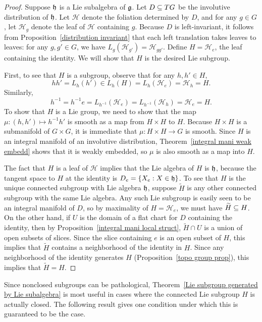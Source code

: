 \begin{proof}
Suppose $\mathfrak{h}$ is a Lie subalgebra of $\mathfrak{g}$. Let $D\subseteq TG$ be the involutive distribution of $\mathfrak{h}$. Let $\mathcal{H}$ denote the foliation determined by $D$, and for any $g\in G$, let $\mathcal{H}_g$ denote the leaf of $\mathcal{H}$ containing $g$. Because $D$ is left-invariant, it follows from Proposition~\ref{distribution invariant} that each left translation takes leaves to leaves: for any $g,g'\in G$, we have $L_g(\mathcal{H}_{g'})=\mathcal{H}_{gg'}$. Define $H=\mathcal{H}_e$, the leaf containing the identity. We will show that $H$ is the desired Lie subgroup.

First, to see that $H$ is a subgroup, observe that for any $h,h'\in H$,
\[hh'=L_h(h')\in L_h(H)=L_h(\mathcal{H}_e)=\mathcal{H}_h=H.\]
Similarly,
\[h^{-1}=h^{-1}e=L_{h^{-1}}(\mathcal{H}_e)=L_{h^{-1}}(\mathcal{H}_h)=\mathcal{H}_e=H.\]
To show that $H$ is a Lie group, we need to show that the map $\mu:(h,h')\mapsto h^{-1}h'$ is smooth as a map from 
$H\times H$ to $H$. Because $H\times H$ is a submanifold of $G\times G$, it is immediate that $\mu:H\times H\to G$ 
is smooth. Since $H$ is an integral manifold of an involutive distribution, Theorem~\ref{integral mani weak embedd} shows that it is weakly embedded, so $\mu$ is
also smooth as a map into $H$.\par
The fact that $H$ is a leaf of $\mathcal{H}$ implies that the Lie algebra of $H$ is $\mathfrak{h}$, because the tangent 
space to $H$ at the identity is $D_e=\{X_e:X\in\mathfrak{h}\}$. To see that $H$ is the unique connected subgroup with Lie 
algebra $\mathfrak{h}$, suppose $\widetilde{H}$ is any other connected subgroup with the same Lie algebra. Any such Lie 
subgroup is easily seen to be an integral manifold of $D$, so by maximality of $H=\mathcal{H}_e$, we must have 
$\widetilde{H}\subseteq H$. On the other hand, if $U$ is the domain of a flat chart for $D$ containing the identity, 
then by Proposition~\ref{integral mani local struct}, $\widetilde{H}\cap U$ is a union of open subsets of slices. 
Since the slice containing $e$ is an open subset of $H$, this implies that $\widetilde{H}$ contains a neighborhood 
of the identity in $H$. Since any neighborhood of the identity generates $H$ (Proposition~\ref{topo group prop}), 
this implies that $\widetilde{H}=H$.
\end{proof}
Since nonclosed subgroups can be pathological, Theorem~\ref{Lie subgroup generated by Lie subalgebra} is most useful in cases where the connected Lie subgroup $H$ is actually closed. The following result gives one condition under which this is guaranteed to be the case.
